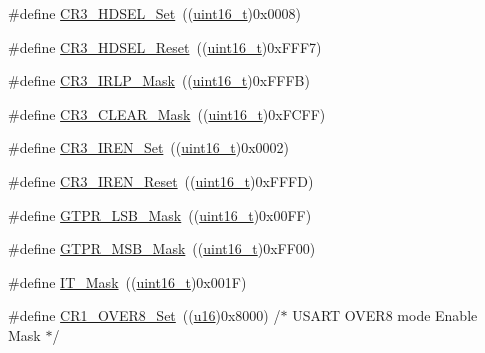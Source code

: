 \begin{DoxyCompactItemize}
\item 
\#define \hyperlink{group___u_s_a_r_t___private___defines_ga0c5c30ea9777d0c8c6f1b5ff85dfca3c}{C\+R3\+\_\+\+H\+D\+S\+E\+L\+\_\+\+Set}~((\hyperlink{_p_e___types_8h_a1f1825b69244eb3ad2c7165ddc99c956}{uint16\+\_\+t})0x0008)
\item 
\#define \hyperlink{group___u_s_a_r_t___private___defines_ga762c72448ba24f3487dfa457a8dcc9fc}{C\+R3\+\_\+\+H\+D\+S\+E\+L\+\_\+\+Reset}~((\hyperlink{_p_e___types_8h_a1f1825b69244eb3ad2c7165ddc99c956}{uint16\+\_\+t})0x\+F\+F\+F7)
\item 
\#define \hyperlink{group___u_s_a_r_t___private___defines_gaea5d8d002a34c3a587719533db2c17f9}{C\+R3\+\_\+\+I\+R\+L\+P\+\_\+\+Mask}~((\hyperlink{_p_e___types_8h_a1f1825b69244eb3ad2c7165ddc99c956}{uint16\+\_\+t})0x\+F\+F\+F\+B)
\item 
\#define \hyperlink{group___u_s_a_r_t___private___defines_ga085e8ef6bc8f5de45c5be95971715f7f}{C\+R3\+\_\+\+C\+L\+E\+A\+R\+\_\+\+Mask}~((\hyperlink{_p_e___types_8h_a1f1825b69244eb3ad2c7165ddc99c956}{uint16\+\_\+t})0x\+F\+C\+F\+F)
\item 
\#define \hyperlink{group___u_s_a_r_t___private___defines_gad5dd1d08f3836f9a3c3f3cc0c66a8b8f}{C\+R3\+\_\+\+I\+R\+E\+N\+\_\+\+Set}~((\hyperlink{_p_e___types_8h_a1f1825b69244eb3ad2c7165ddc99c956}{uint16\+\_\+t})0x0002)
\item 
\#define \hyperlink{group___u_s_a_r_t___private___defines_gad1520358de97e48fe18780e5cc5296bd}{C\+R3\+\_\+\+I\+R\+E\+N\+\_\+\+Reset}~((\hyperlink{_p_e___types_8h_a1f1825b69244eb3ad2c7165ddc99c956}{uint16\+\_\+t})0x\+F\+F\+F\+D)
\item 
\#define \hyperlink{group___u_s_a_r_t___private___defines_ga2fe593d0c308e2245bb66905930b3ebb}{G\+T\+P\+R\+\_\+\+L\+S\+B\+\_\+\+Mask}~((\hyperlink{_p_e___types_8h_a1f1825b69244eb3ad2c7165ddc99c956}{uint16\+\_\+t})0x00\+F\+F)
\item 
\#define \hyperlink{group___u_s_a_r_t___private___defines_ga405b4222892bafdf1d084de5efd24d70}{G\+T\+P\+R\+\_\+\+M\+S\+B\+\_\+\+Mask}~((\hyperlink{_p_e___types_8h_a1f1825b69244eb3ad2c7165ddc99c956}{uint16\+\_\+t})0x\+F\+F00)
\item 
\#define \hyperlink{group___u_s_a_r_t___private___defines_ga401c753d4de6ab56fcb026c91b8c8487}{I\+T\+\_\+\+Mask}~((\hyperlink{_p_e___types_8h_a1f1825b69244eb3ad2c7165ddc99c956}{uint16\+\_\+t})0x001\+F)
\item 
\#define \hyperlink{group___u_s_a_r_t___private___defines_ga11495857ca81074790c376317382140f}{C\+R1\+\_\+\+O\+V\+E\+R8\+\_\+\+Set}~((\hyperlink{agilefox_2library_2inc_2stm32f10x__type_8h_a9e6c91d77e24643b888dbd1a1a590054}{u16})0x8000)  /$\ast$ U\+S\+A\+R\+T O\+V\+E\+R8 mode Enable Mask $\ast$/

\end{DoxyCompactItemize}
